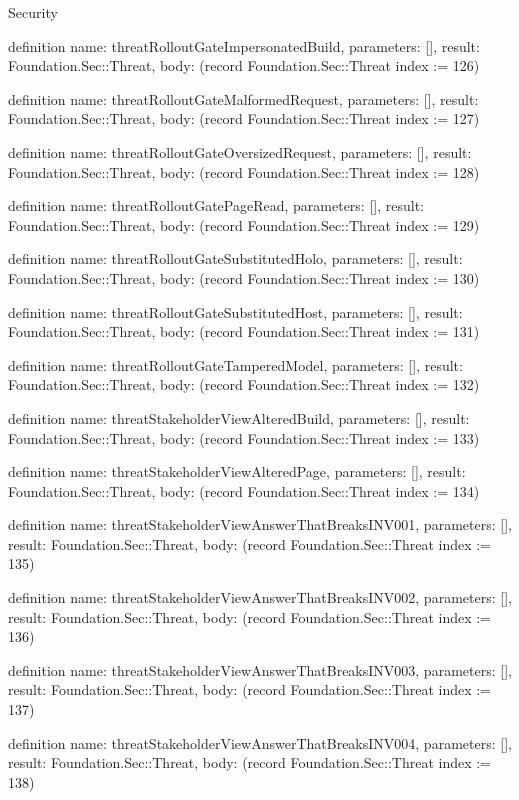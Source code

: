 \begin{lexlean}{Security}
\begin{semanticmodule}
definition{
  name: threatRolloutGateImpersonatedBuild,
  parameters: [],
  result: Foundation.Sec::Threat,
  body: (record Foundation.Sec::Threat {index := 126})
}

definition{
  name: threatRolloutGateMalformedRequest,
  parameters: [],
  result: Foundation.Sec::Threat,
  body: (record Foundation.Sec::Threat {index := 127})
}

definition{
  name: threatRolloutGateOversizedRequest,
  parameters: [],
  result: Foundation.Sec::Threat,
  body: (record Foundation.Sec::Threat {index := 128})
}

definition{
  name: threatRolloutGatePageRead,
  parameters: [],
  result: Foundation.Sec::Threat,
  body: (record Foundation.Sec::Threat {index := 129})
}

definition{
  name: threatRolloutGateSubstitutedHolo,
  parameters: [],
  result: Foundation.Sec::Threat,
  body: (record Foundation.Sec::Threat {index := 130})
}

definition{
  name: threatRolloutGateSubstitutedHost,
  parameters: [],
  result: Foundation.Sec::Threat,
  body: (record Foundation.Sec::Threat {index := 131})
}

definition{
  name: threatRolloutGateTamperedModel,
  parameters: [],
  result: Foundation.Sec::Threat,
  body: (record Foundation.Sec::Threat {index := 132})
}

definition{
  name: threatStakeholderViewAlteredBuild,
  parameters: [],
  result: Foundation.Sec::Threat,
  body: (record Foundation.Sec::Threat {index := 133})
}

definition{
  name: threatStakeholderViewAlteredPage,
  parameters: [],
  result: Foundation.Sec::Threat,
  body: (record Foundation.Sec::Threat {index := 134})
}

definition{
  name: threatStakeholderViewAnswerThatBreaksINV001,
  parameters: [],
  result: Foundation.Sec::Threat,
  body: (record Foundation.Sec::Threat {index := 135})
}

definition{
  name: threatStakeholderViewAnswerThatBreaksINV002,
  parameters: [],
  result: Foundation.Sec::Threat,
  body: (record Foundation.Sec::Threat {index := 136})
}

definition{
  name: threatStakeholderViewAnswerThatBreaksINV003,
  parameters: [],
  result: Foundation.Sec::Threat,
  body: (record Foundation.Sec::Threat {index := 137})
}

definition{
  name: threatStakeholderViewAnswerThatBreaksINV004,
  parameters: [],
  result: Foundation.Sec::Threat,
  body: (record Foundation.Sec::Threat {index := 138})
}


\end{semanticmodule}
\end{lexlean}
